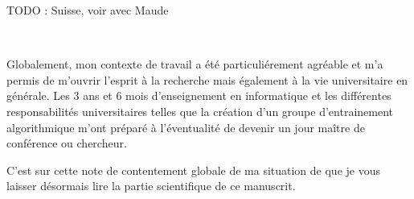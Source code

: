 TODO : Suisse, voir avec Maude

~~

Globalement, mon contexte de travail a été particuliérement agréable et m'a permis de m'ouvrir l'esprit à la recherche mais également à la vie universitaire en générale.
Les 3 ans et 6 mois d'enseignement en informatique et les différentes responsabilités universitaires telles que la création d'un groupe d'entrainement algorithmique m'ont préparé à l'éventualité de devenir un jour maître de conférence ou chercheur.

C'est sur cette note de contentement globale de ma situation de que je vous laisser désormais lire la partie scientifique de ce manuscrit.


























